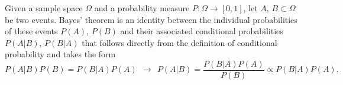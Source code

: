 \documentclass{amsart}
\begin{document}
Given a sample space $\Omega$ and a probability measure $P:\Omega\rightarrow[0,1]$, 
let $A$, $B \subset\Omega$ be two events.  Bayes' theorem is an identity between 
the individual probabilities of these events $P(A)$, $P(B)$ and their associated conditional 
probabilities $P(A|B)$, $P(B|A)$ that follows directly from the definition of 
conditional probability and takes the form
%
\begin{equation}
    P(A|B) P(B) = P(B|A) P(A) \:\:\longrightarrow \:\:P(A|B) = \frac{P(B|A)P(A)}{P(B)}
    \propto P(B|A)P(A). \label{baythm}
\end{equation}
%
\end{document}
